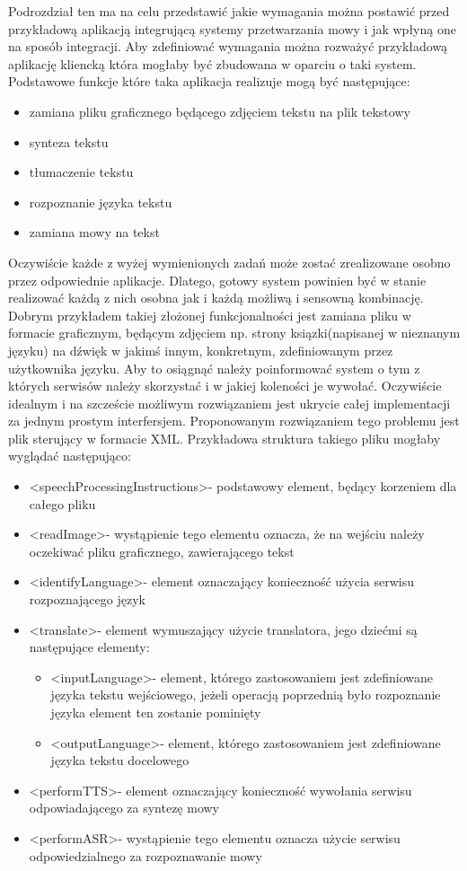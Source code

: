 Podrozdział ten ma na celu przedstawić jakie wymagania można postawić przed przykładową aplikacją integrującą systemy przetwarzania mowy i jak wpłyną one na sposób integracji. Aby zdefiniować wymagania można rozważyć przykładową aplikację kliencką która mogłaby być zbudowana w oparciu o taki system. Podstawowe funkcje które taka aplikacja realizuje mogą być następujące:
\begin{itemize}
	\item zamiana pliku graficznego będącego zdjęciem tekstu na plik tekstowy
	\item synteza tekstu
	\item tłumaczenie tekstu
	\item rozpoznanie języka tekstu
	\item zamiana mowy na tekst
\end{itemize}
Oczywiście każde z wyżej wymienionych zadań może zostać zrealizowane osobno przez odpowiednie aplikacje. Dlatego, gotowy system powinien być w stanie realizować każdą z nich osobna jak i każdą możliwą i sensowną kombinację. Dobrym przykładem takiej złożonej funkcjonalności jest zamiana pliku w formacie graficznym, będącym zdjęciem np. strony ksiązki(napisanej w nieznanym języku) na dźwięk w jakimś innym, konkretnym, zdefiniowanym przez użytkownika języku. Aby to osiągnąć należy poinformować system o tym z których serwisów należy skorzystać i w jakiej koleności je wywołać. Oczywiście idealnym i na szczeście możliwym rozwiązaniem jest ukrycie całej implementacji za jednym prostym interfersjem. Proponowanym rozwiązaniem tego problemu jest plik sterujący w formacie XML. Przykładowa struktura takiego pliku mogłaby wyglądać następująco:
 \begin{itemize}
	\item \textless speechProcessingInstructions\textgreater - podstawowy element, będący korzeniem dla całego pliku
	\item \textless readImage\textgreater - wystąpienie tego elementu oznacza, że na wejściu należy oczekiwać pliku graficznego, zawierającego tekst
	\item \textless identifyLanguage\textgreater - element oznaczający konieczność użycia serwisu rozpoznającego język
	\item \textless translate\textgreater - element wymuszający użycie translatora, jego dziećmi są następujące elementy:
		 \begin{itemize}
			\item \textless inputLanguage\textgreater - element, którego zastosowaniem jest zdefiniowane języka tekstu wejściowego, jeżeli operacją poprzednią  było rozpoznanie języka element ten zostanie pominięty
			\item \textless outputLanguage\textgreater - element, którego zastosowaniem jest zdefiniowane języka tekstu docelowego
		\end{itemize}
	\item \textless performTTS\textgreater - element oznaczający konieczność wywołania serwisu odpowiadającego za syntezę mowy
	\item \textless performASR\textgreater - wystąpienie tego elementu oznacza użycie serwisu odpowiedzialnego  za rozpoznawanie mowy
\end{itemize}
